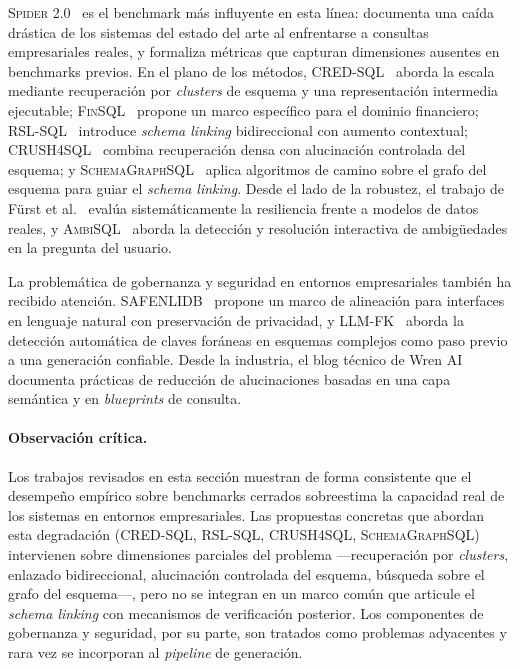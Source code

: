 \textsc{Spider 2.0}~\cite{spider2_2025} es el benchmark más influyente en
esta línea: documenta una caída drástica de los sistemas del estado del arte
al enfrentarse a consultas empresariales reales, y formaliza métricas que
capturan dimensiones ausentes en benchmarks previos. En el plano de los
métodos, \textsc{CRED-SQL}~\cite{CRED-SQL2025} aborda la escala mediante
recuperación por \emph{clusters} de esquema y una representación intermedia
ejecutable; \textsc{FinSQL}~\cite{FinSQL2024} propone un marco específico
para el dominio financiero; \textsc{RSL-SQL}~\cite{RSL-SQL2024} introduce
\emph{schema linking} bidireccional con aumento contextual;
\textsc{CRUSH4SQL}~\cite{CRUSH4SQL2023} combina recuperación densa con
alucinación controlada del esquema; y
\textsc{SchemaGraphSQL}~\cite{SchemaGraphSQL} aplica algoritmos de camino
sobre el grafo del esquema para guiar el \emph{schema linking}. Desde el
lado de la robustez, el trabajo de Fürst et al.~\cite{EvaluatingRobustness}
evalúa sistemáticamente la resiliencia frente a modelos de datos reales, y
\textsc{AmbiSQL}~\cite{AmbiSQL} aborda la detección y resolución
interactiva de ambigüedades en la pregunta del usuario.

La problemática de gobernanza y seguridad en entornos empresariales también
ha recibido atención. \textsc{SAFENLIDB}~\cite{SAFENLIDB} propone un marco
de alineación para interfaces en lenguaje natural con preservación de
privacidad, y \textsc{LLM-FK}~\cite{llmfk} aborda la detección automática
de claves foráneas en esquemas complejos como paso previo a una generación
confiable. Desde la industria, el blog técnico de Wren AI~\cite{WrenAI2025}
documenta prácticas de reducción de alucinaciones basadas en una capa
semántica y en \emph{blueprints} de consulta.

\paragraph{Observación crítica.} Los trabajos revisados en esta sección
muestran de forma consistente que el desempeño empírico sobre benchmarks
cerrados sobreestima la capacidad real de los sistemas en entornos
empresariales. Las propuestas concretas que abordan esta degradación
(\textsc{CRED-SQL}, \textsc{RSL-SQL}, \textsc{CRUSH4SQL},
\textsc{SchemaGraphSQL}) intervienen sobre dimensiones parciales del
problema ---recuperación por \emph{clusters}, enlazado bidireccional,
alucinación controlada del esquema, búsqueda sobre el grafo del
esquema---, pero no se integran en un marco común que articule el
\emph{schema linking} con mecanismos de verificación posterior. Los
componentes de gobernanza y seguridad, por su parte, son tratados como
problemas adyacentes y rara vez se incorporan al \emph{pipeline} de
generación.

